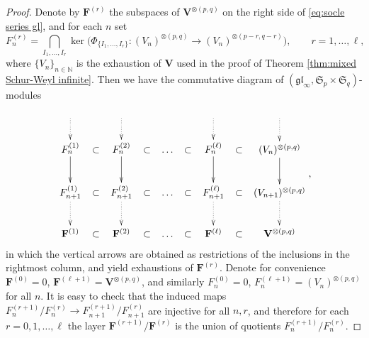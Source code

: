 \documentclass[12pt,reqno]{amsart}
\numberwithin{equation}{section}
\theoremstyle{plain}
\theoremstyle{definition}
\def\N{\mathbb N}
\def\gl{\mathfrak{gl}}
\def\o{\otimes}
\def\FF{{\mathbf F}}
\def\VV{\mathbf V}
\begin{document}
\begin{proof}
Denote by $\FF^{(r)}$ the subspaces of $\VV^{\o(p,q)}$ on the right
side of \eqref{eq:socle series gl}, and for each $n$ set
\begin{equation*}
    F_n^{(r)} = \bigcap_{I_1,\dots,I_r} \ker
    \biggr( \Phi_{ \{I_1,\dots,I_r\} }: (V_n)^{\o(p,q)} \to
    (V_n)^{\o(p-r,q-r)}\biggr),
    \qquad r=1,\dots,\ell,
\end{equation*}
where $\{V_n\}_{n \in \N}$ is the exhaustion of $\VV$ used in the
proof of Theorem \ref{thm:mixed Schur-Weyl infinite}. Then we have
the commutative diagram of $(\gl_\infty,\mathfrak S_p \times
\mathfrak S_q)$-modules
\begin{equation*}
\begin{gathered}
\xymatrix@C=5pt{
    \ar@{.>}[d] & &  \ar@{.>}[d] & & & & \ar@{.>}[d] & & \ar@{.>}[d]
    \\
    F_n^{(1)}  \ar@{->}[d] & \subset & F_n^{(2)}  \ar@{->}[d] & \subset & \dots & \subset &
    F_n^{(\ell)}  \ar@{->}[d] & \subset & (V_n)^{\o(p,q)} \ar[d]
    \\
    F_{n+1}^{(1)} \ar@{.>}[d] & \subset
    & F_{n+1}^{(2)} \ar@{.>}[d] & \subset & \dots & \subset & F_{n+1}^{(\ell)} \ar@{.>}[d]
    & \subset &     (V_{n+1})^{\o(p,q)} \ar@{.>}[d]
    \\
    \FF^{(1)}  & \subset
    & \FF^{(2)} & \subset & \dots & \subset & \FF^{(\ell)}  & \subset & \VV^{\o(p,q)}
    }
\end{gathered},
\end{equation*}
in which the vertical arrows are obtained as restrictions of the
inclusions in the rightmost column, and yield exhaustions of
$\FF^{(r)}$. Denote for convenience  $\FF^{(0)} = 0$,
$\FF^{(\ell+1)} = \VV^{\o(p,q)}$, and similarly $F_n^{(0)} = 0$,
$F_n^{(\ell+1)} = (V_n)^{\o(p,q)}$ for all $n$. It is easy to check
that the induced maps $F_n^{(r+1)}/ F_{n}^{(r)} \to F_{n+1}^{(r+1)}/
F_{n+1}^{(r)}$ are injective for all $n,r$, and therefore for each
$r=0,1,\dots,\ell$ the layer $\FF^{(r+1)}/\FF^{(r)}$ is the union of
quotients $F_n^{(r+1)}/ F_{n}^{(r)}$.



\end{proof}
\end{document}
